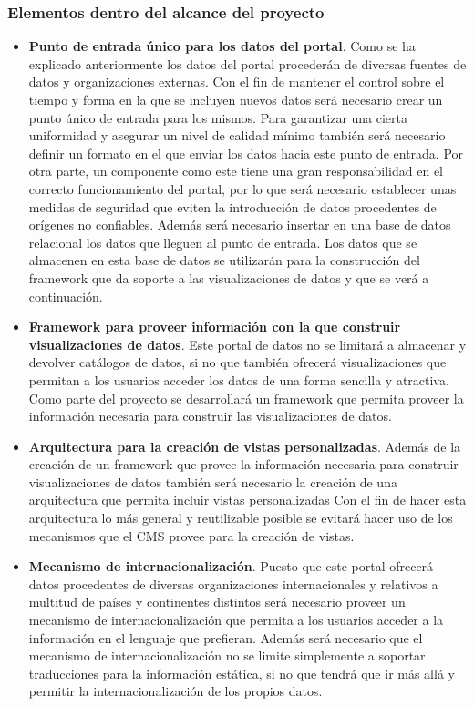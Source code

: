 \subsubsection{Elementos dentro del alcance del proyecto}
\begin{itemize}
\item \textbf{Punto de entrada único para los datos del portal}.  Como se ha explicado anteriormente los datos del portal procederán de diversas fuentes de datos y organizaciones externas.  Con el fin de mantener el control sobre el tiempo y forma en la que se incluyen nuevos datos será necesario crear un punto único de entrada para los mismos.  Para garantizar una cierta uniformidad y asegurar un nivel de calidad mínimo también será necesario definir un formato en el que enviar los datos hacia este punto de entrada.\newline
Por otra parte, un componente como este tiene una gran responsabilidad en el correcto funcionamiento del portal, por lo que será necesario establecer unas medidas de seguridad que eviten la introducción de datos procedentes de orígenes no confiables.\newline
Además será necesario insertar en una base de datos relacional los datos que lleguen al punto de entrada.  Los datos que se almacenen en esta base de datos se utilizarán para la construcción del framework que da soporte a las visualizaciones de datos y que se verá a continuación.
\item \textbf{Framework para proveer información con la que construir visualizaciones de datos}.  Este portal de datos no se limitará a almacenar y devolver catálogos de datos, si no que también ofrecerá visualizaciones que permitan a los usuarios acceder los datos de una forma sencilla y atractiva.  Como parte del proyecto se desarrollará un framework que permita proveer la información necesaria para construir las visualizaciones de datos.
\item \textbf{Arquitectura para la creación de vistas personalizadas}.  Además de la creación de un framework que provee la información necesaria para construir visualizaciones de datos también será necesario la creación de una arquitectura que permita incluir vistas personalizadas   Con el fin de hacer esta arquitectura lo más general y reutilizable posible se evitará hacer uso de los mecanismos que el CMS provee para la creación de vistas.
\item \textbf{Mecanismo de internacionalización}.  Puesto que este portal ofrecerá datos procedentes de diversas organizaciones internacionales y relativos a multitud de países y continentes distintos será necesario proveer un mecanismo de internacionalización que permita a los usuarios acceder a la información en el lenguaje que prefieran.  Además será necesario que el mecanismo de internacionalización no se limite simplemente a soportar traducciones para la información estática, si no que tendrá que ir más allá y permitir la internacionalización de los propios datos.

\end{itemize}
